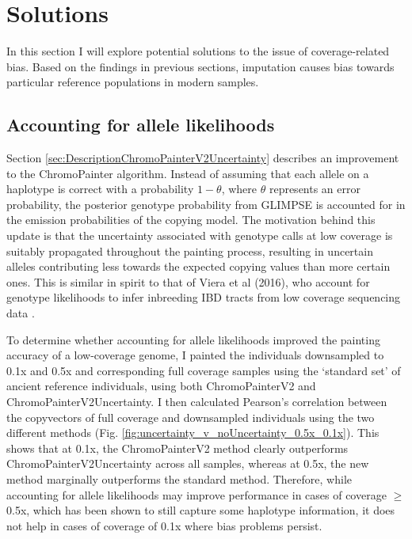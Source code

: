 \section{Solutions} \label{sec:Solutions}

In this section I will explore potential solutions to the issue of coverage-related bias. Based on the findings in previous sections, imputation causes bias towards particular reference populations in modern samples.  

\subsection{Accounting for allele likelihoods}

Section \ref{sec:DescriptionChromoPainterV2Uncertainty} describes an improvement to the ChromoPainter algorithm. Instead of assuming that each allele on a haplotype is correct with a probability $1-\theta$, where $\theta$ represents an error probability, the posterior genotype probability from GLIMPSE is accounted for in the emission probabilities of the copying model. The motivation behind this update is that the uncertainty associated with genotype calls at low coverage is suitably propagated throughout the painting process, resulting in uncertain alleles contributing less towards the expected copying values than more certain ones. This is similar in spirit to that of Viera et al (2016), who account for genotype likelihoods to infer inbreeding IBD tracts from low coverage sequencing data \cite{vieira2016estimating}.

To determine whether accounting for allele likelihoods improved the painting accuracy of a low-coverage genome, I painted the individuals downsampled to 0.1x and 0.5x and corresponding full coverage samples using the `standard set' of ancient reference individuals, using both ChromoPainterV2 and ChromoPainterV2Uncertainty. I then calculated Pearson's correlation between the copyvectors of full coverage and downsampled individuals using the two different methods (Fig. \ref{fig:uncertainty_v_noUncertainty_0.5x_0.1x}). This shows that at 0.1x, the ChromoPainterV2 method clearly outperforms ChromoPainterV2Uncertainty across all samples, whereas at 0.5x, the new method marginally outperforms the standard method. Therefore, while accounting for allele likelihoods may improve performance in cases of coverage $\geq$0.5x, which has been shown to still capture some haplotype information, it does not help in cases of coverage of 0.1x where bias problems persist.


